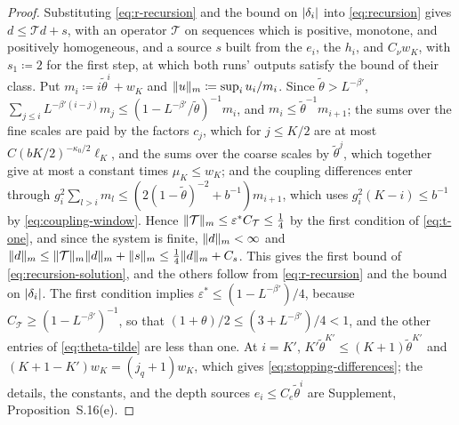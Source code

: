 \documentclass[11pt]{preprint}
\DeclarePairedDelimiter{\abs}{\lvert}{\rvert}
\DeclarePairedDelimiter{\norm}{\lVert}{\rVert}
\numberwithin{equation}{section}
\theoremstyle{definition}
\theoremstyle{remark}
\theoremstyle{plain}
\begin{document}
\begin{proof}
Substituting \eqref{eq:r-recursion} and the bound on $\abs{\delta_i}$ into \eqref{eq:recursion} gives $d \leq \mathcal Td + s$, with an operator $\mathcal T$ on sequences which is positive, monotone, and positively homogeneous, and a source $s$ built from the $e_i$, the $h_i$, and $C_\nu w_K$, with $s_1 \coloneqq 2$ for the first step, at which both runs' outputs satisfy the bound of their class. Put $m_i \coloneqq i\tilde\theta^i + w_K$ and $\norm{u}_m \coloneqq \sup_iu_i/m_i$. Since $\tilde\theta > L^{-\beta'}$, $\sum_{j \leq i}L^{-\beta'(i-j)}m_j \leq (1 - L^{-\beta'}/\tilde\theta)^{-1}m_i$, and $m_i \leq \tilde\theta^{-1}m_{i+1}$; the sums over the fine scales are paid by the factors $c_j$, which for $j \leq K/2$ are at most $C(bK/2)^{-\kappa_0/2}\ell_K$, and the sums over the coarse scales by $\tilde\theta^j$, which together give at most a constant times $\mu_K \leq w_K$; and the coupling differences enter through $g_i^2\sum_{l > i}m_l \leq (2(1 - \tilde\theta)^{-2} + b^{-1})m_{i+1}$, which uses $g_i^2(K - i) \leq b^{-1}$ by \eqref{eq:coupling-window}. Hence $\norm{\mathcal T}_m \leq \varepsilon^*C_{\mathcal T} \leq \frac14$ by the first condition of \eqref{eq:t-one}, and since the system is finite, $\norm{d}_m < \infty$ and $\norm{d}_m \leq \norm{\mathcal T}_m\norm{d}_m + \norm{s}_m \leq \frac14\norm{d}_m + C_s$. This gives the first bound of \eqref{eq:recursion-solution}, and the others follow from \eqref{eq:r-recursion} and the bound on $\abs{\delta_i}$. The first condition implies $\varepsilon^* \leq (1 - L^{-\beta'})/4$, because $C_{\mathcal T} \geq (1 - L^{-\beta'})^{-1}$, so that $(1 + \theta)/2 \leq (3 + L^{-\beta'})/4 < 1$, and the other entries of \eqref{eq:theta-tilde} are less than one. At $i = K'$, $K'\tilde\theta^{K'} \leq (K + 1)\tilde\theta^{K'}$ and $(K + 1 - K')w_K = (j_q + 1)w_K$, which gives \eqref{eq:stopping-differences}; the details, the constants, and the depth sources $e_i \leq C_e\tilde\theta^i$ are Supplement, Proposition~S.16(e).
\end{proof}
\end{document}
